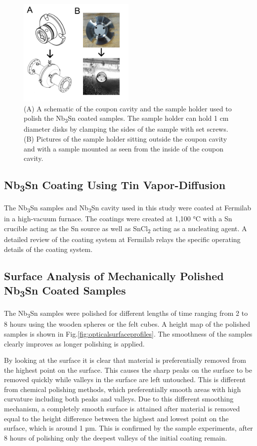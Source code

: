 \documentclass[reprint,amsmath,amssymb,aps]{revtex4-2}%
\begin{document}
\begin{figure}[htb]%
\centering%
\includegraphics[width=0.5\textwidth]{../doc/figs/Coupon_Cavity.png}%
\caption{(A) A schematic of the coupon cavity and the sample holder used to polish the Nb\textsubscript{3}Sn coated samples. The sample holder can hold 1 cm diameter disks by clamping the sides of the sample with set screws. (B) Pictures of the sample holder sitting outside the coupon cavity and with a sample mounted as seen from the inside of the coupon cavity.}%
\label{fig:couponcavity}%
\end{figure}

%
\subsection{Nb\textsubscript{3}Sn Coating Using Tin Vapor-Diffusion}%
\label{subsec:nb3sncoating}%
The Nb\textsubscript{3}Sn samples and Nb\textsubscript{3}Sn cavity used in this study were coated at Fermilab in a high-vacuum furnace. The coatings were created at 1,100 °C with a Sn crucible acting as the Sn source as well as SnCl\textsubscript{2} acting as a nucleating agent. A detailed review of the coating system at Fermilab relays the specific operating details of the coating system\cite{posen2017nb3sn}.

%
\subsection{Surface Analysis of Mechanically Polished Nb\textsubscript{3}Sn Coated Samples}%
\label{subsec:sampleanalysis}%
The Nb\textsubscript{3}Sn samples were polished for different lengths of time ranging from 2 to 8 hours using the wooden spheres or the felt cubes. A height map of the polished samples is shown in Fig.\ref{fig:opticalsurfaceprofiles}. The smoothness of the samples clearly improves as longer polishing is applied. 

By looking at the surface it is clear that material is preferentially removed from the highest point on the surface. This causes the sharp peaks on the surface to be removed quickly while valleys in the surface are left untouched. This is different from chemical polishing methods, which preferentially smooth areas with high curvature including both peaks and valleys. Due to this different smoothing mechanism, a completely smooth surface is attained after material is removed equal to the height difference between the highest and lowest point on the surface, which is around 1 µm. This is confirmed by the sample experiments, after 8 hours of polishing only the deepest valleys of the initial coating remain.
\end{document}
